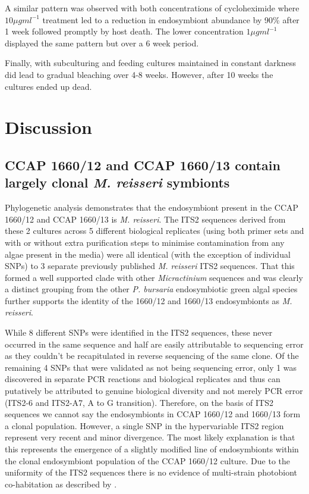 A similar pattern was observed with both concentrations of
cycloheximide where \(10\mu g ml^{-1}\) treatment 
led to a reduction in endosymbiont abundance by 90\%
after 1 week followed promptly by host death. 
The lower concentration \(1\mu g ml^{-1}\) 
displayed the same pattern but over a 6 week period.

Finally, with subculturing and feeding cultures maintained in 
constant darkness did lead to gradual bleaching over 4-8 weeks.
However, after 10 weeks the cultures ended up dead. 


\section{Discussion}

\subsection{CCAP 1660/12 and CCAP 1660/13 contain largely clonal \textit{M. reisseri} symbionts}

Phylogenetic analysis demonstrates that the endosymbiont present in the CCAP 1660/12
and CCAP 1660/13 is \textit{M. reisseri}.  The ITS2 sequences derived from these
2 cultures across 5 different biological replicates (using both primer sets and with or without 
extra purification steps to minimise contamination from any algae present in the media) 
were all identical (with the exception of individual SNPs) 
to 3 separate previously published \textit{M. reisseri} ITS2 sequences. That this formed
a well supported clade with other \textit{Micractinium} sequences and was clearly a distinct
grouping from the other \textit{P. bursaria} endosymbiotic green algal species 
further supports the identity of the 1660/12 and 1660/13 endosymbionts as \textit{M. reisseri}.

While 8 different SNPs were identified in the ITS2 sequences, these never occurred in the same
sequence and half are easily attributable to sequencing error as they couldn't be recapitulated
in reverse sequencing of the same clone.  Of the remaining 4 SNPs that were validated
as not being sequencing error, only 1 was discovered in separate PCR reactions and biological replicates
and thus can putatively be attributed to genuine biological diversity and not merely PCR error
(ITS2-6 and ITS2-A7, A to G transition). Therefore, on the basis of ITS2 sequences
we cannot say the endosymbionts in CCAP 1660/12 and 1660/13 form a clonal population.
However, a single SNP in the hypervariable ITS2 region represent very recent and minor
divergence.  The most likely explanation is that this represents the emergence of a slightly modified
line of endosymbionts within the clonal endosymbiont population of the CCAP 1660/12 culture.  
Due to the uniformity of the ITS2 sequences there is no evidence of multi-strain photobiont co-habitation as 
described by \citep{Hoshina2012}.

